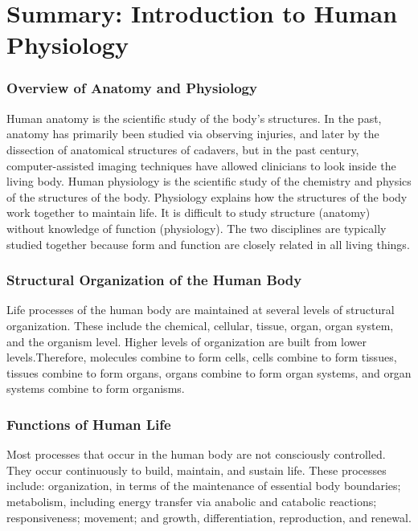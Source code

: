\documentclass{book}
\begin{document}
\section{Summary: Introduction to Human Physiology}
\label{reading:intro_physiology}

\subsubsection{Overview of Anatomy and Physiology}

Human anatomy is the scientific study of the body’s structures. In the past, anatomy has primarily been studied via observing injuries, and later by the dissection of anatomical structures of cadavers, but in the past century, computer-assisted imaging techniques have allowed clinicians to look inside the living body. Human physiology is the scientific study of the chemistry and physics of the structures of the body. Physiology explains how the structures of the body work together to maintain life. It is difficult to study structure (anatomy) without knowledge of function (physiology). The two disciplines are typically studied together because form and function are closely related in all living things.

\subsubsection{Structural Organization of the Human Body}

Life processes of the human body are maintained at several levels of structural organization. These include the chemical, cellular, tissue, organ, organ system, and the organism level. Higher levels of organization are built from lower levels.Therefore, molecules combine to form cells, cells combine to form tissues, tissues combine to form organs, organs combine to form organ systems, and organ systems combine to form organisms.

\subsubsection{Functions of Human Life}

Most processes that occur in the human body are not consciously controlled. They occur continuously to build, maintain, and sustain life. These processes include: organization, in terms of the maintenance of essential body boundaries; metabolism, including energy transfer via anabolic and catabolic reactions; responsiveness; movement; and growth, differentiation, reproduction, and renewal.
\end{document}
